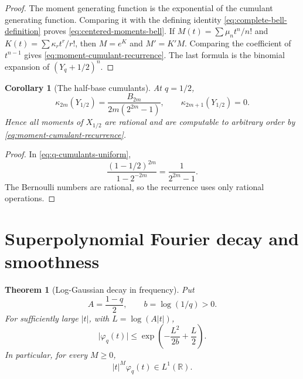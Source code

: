 \documentclass[11pt,oneside,openany]{book}
\newtheorem{theorem}{Theorem}[chapter]
\newtheorem{corollary}[corollary]{Corollary}
\theoremstyle{definition}
\theoremstyle{remark}
\newcommand{\R}{\mathbb R}
\newcommand{\abs}[1]{\lvert #1\rvert}
\begin{document}
\begin{proof}
The moment generating function is the exponential of the cumulant generating function.  Comparing it with the defining identity
\eqref{eq:complete-bell-definition} proves \eqref{eq:centered-moments-bell}.  If
$M(t)=\sum\mu_nt^n/n!$ and $K(t)=\sum\kappa_rt^r/r!$, then
$M=e^K$ and $M'=K'M$.  Comparing the coefficient of $t^{n-1}$ gives
\eqref{eq:moment-cumulant-recurrence}.  The last formula is the binomial expansion of $(Y_q+1/2)^n$.
\end{proof}

\begin{corollary}[The half-base cumulants]\label{cor:halfbase-cumulants}
At $q=1/2$,
\begin{equation}\label{eq:halfbase-cumulants}
 \kappa_{2m}(Y_{1/2})
 =\frac{B_{2m}}{2m(2^{2m}-1)},
 \qquad
 \kappa_{2m+1}(Y_{1/2})=0.
\end{equation}
Hence all moments of $X_{1/2}$ are rational and are computable to arbitrary order by \eqref{eq:moment-cumulant-recurrence}.
\end{corollary}

\begin{proof}
In \eqref{eq:q-cumulants-uniform},
\[
 \frac{(1-1/2)^{2m}}{1-2^{-2m}}
 =\frac1{2^{2m}-1}.
\]
The Bernoulli numbers are rational, so the recurrence uses only rational operations.
\end{proof}

\section{Superpolynomial Fourier decay and smoothness}

\begin{theorem}[Log-Gaussian decay in frequency]\label{thm:geometric-uniform-fourier-decay}
Put
\[
 A=\frac{1-q}{2},
 \qquad
 b=\log(1/q)>0.
\]
For sufficiently large $\abs t$, with $L=\log(A\abs t)$,
\begin{equation}\label{eq:log-gaussian-fourier-bound}
 \abs{\varphi_q(t)}
 \le \exp\!\left(-\frac{L^2}{2b}+\frac L2\right).
\end{equation}
In particular, for every $M\ge0$,
\[
 \abs t^M\varphi_q(t)\in L^1(\R).
\]
\end{theorem}
\end{document}

